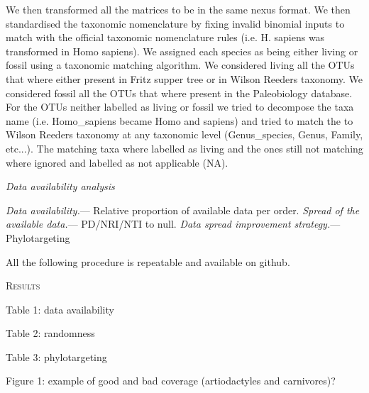 \documentclass[12pt,letterpaper]{article}
\renewcommand{\section}[1]{%
\bigskip
\begin{center}
\begin{Large}
\normalfont\scshape #1
\medskip
\end{Large}
\end{center}}
\renewcommand{\subsection}[1]{%
\bigskip
\begin{center}
\begin{large}
\normalfont\itshape #1
\end{large}
\end{center}}
\renewcommand{\subsubsection}[1]{%
\vspace{2ex}
\noindent
\textit{#1.}---}
\begin{document}
We then transformed all the matrices to be in the same nexus format. We then standardised the taxonomic nomenclature by fixing invalid binomial inputs to match with the official taxonomic nomenclature rules (i.e. H. sapiens was transformed in Homo sapiens). We assigned each species as being either living or fossil using a taxonomic matching algorithm. We considered living all the OTUs that where either present in Fritz supper tree or in Wilson Reeders taxonomy. We considered fossil all the OTUs that where present in the Paleobiology database. For the OTUs neither labelled as living or fossil we tried to decompose the taxa name (i.e. Homo_sapiens became Homo and sapiens) and tried to match the to Wilson Reeders taxonomy at any taxonomic level (Genus_species, Genus, Family, etc...). The matching taxa where labelled as living and the ones still not matching where ignored and labelled as not applicable (NA).

\subsection{Data availability analysis}
\subsubsection{Data availability}
Relative proportion of available data per order.
\subsubsection{Spread of the available data}
PD/NRI/NTI to null.
\subsubsection{Data spread improvement strategy}
Phylotargeting

All the following procedure is repeatable and available on github.

%
%

\section{Results}
Table 1: data availability

Table 2: randomness

Table 3: phylotargeting

Figure 1: example of good and bad coverage (artiodactyles and carnivores)?
\end{document}

